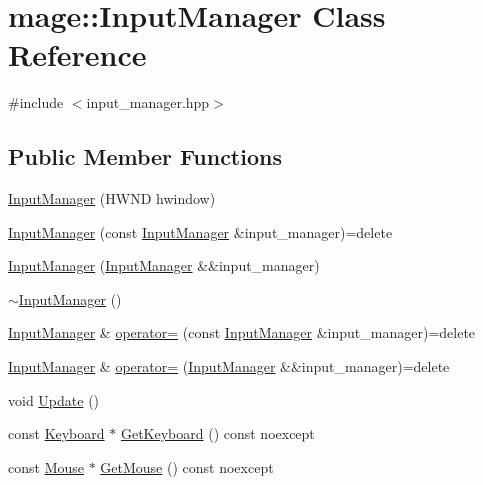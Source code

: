 \hypertarget{classmage_1_1_input_manager}{}\section{mage\+:\+:Input\+Manager Class Reference}
\label{classmage_1_1_input_manager}


{\ttfamily \#include $<$input\+\_\+manager.\+hpp$>$}

\subsection*{Public Member Functions}
\begin{DoxyCompactItemize}
\item 
\hyperlink{classmage_1_1_input_manager_afc28df27a0251c242113a9761c007534}{Input\+Manager} (H\+W\+ND hwindow)
\item 
\hyperlink{classmage_1_1_input_manager_a68503617f418bf270dc39bb18019b46d}{Input\+Manager} (const \hyperlink{classmage_1_1_input_manager}{Input\+Manager} \&input\+\_\+manager)=delete
\item 
\hyperlink{classmage_1_1_input_manager_ae9e37a3157c7880aa09226e56c4e97c4}{Input\+Manager} (\hyperlink{classmage_1_1_input_manager}{Input\+Manager} \&\&input\+\_\+manager)
\item 
\hyperlink{classmage_1_1_input_manager_a287ca0e91ec079227c102f7eadd5bb46}{$\sim$\+Input\+Manager} ()
\item 
\hyperlink{classmage_1_1_input_manager}{Input\+Manager} \& \hyperlink{classmage_1_1_input_manager_ad9caa8b7e99a69b774887f342bd5dda0}{operator=} (const \hyperlink{classmage_1_1_input_manager}{Input\+Manager} \&input\+\_\+manager)=delete
\item 
\hyperlink{classmage_1_1_input_manager}{Input\+Manager} \& \hyperlink{classmage_1_1_input_manager_ae7c1c4d2d55d86cbc88a5fbc2f1279a8}{operator=} (\hyperlink{classmage_1_1_input_manager}{Input\+Manager} \&\&input\+\_\+manager)=delete
\item 
void \hyperlink{classmage_1_1_input_manager_a5e516969ff4ae9876b98c28f48f93726}{Update} ()
\item 
const \hyperlink{classmage_1_1_keyboard}{Keyboard} $\ast$ \hyperlink{classmage_1_1_input_manager_a2ceb6e20c122f7029cb75b970a11d58d}{Get\+Keyboard} () const noexcept
\item 
const \hyperlink{classmage_1_1_mouse}{Mouse} $\ast$ \hyperlink{classmage_1_1_input_manager_aae51ef1fb225466d956f75372f166e38}{Get\+Mouse} () const noexcept
\end{DoxyCompactItemize}
